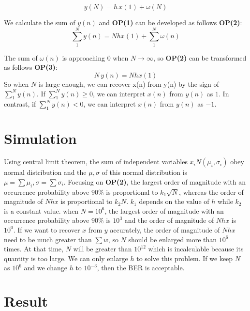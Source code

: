 \documentclass[conference]{IEEEtran}
\begin{document}
\begin{equation}
y(N) = h\,x(1)+\omega(N)
\end{equation}

We calculate the sum of $y(n)$ and \textbf{OP(1)} can be developed as follows \textbf{OP(2)}:
\begin{equation}
\sum^N_1 y(n) = Nhx(1)+\sum^N_1 \omega(n)
\end{equation}

The sum of $\omega(n)$ is approaching $0$ when $N\to \infty$, so \textbf{OP(2)} can be transformed as follows \textbf{OP(3)}:
\begin{equation}
N\,y(n)=Nhx(1)
\end{equation}
So when $N$ is large enough, we can recover x(n) from y(n) by the sign of $\sum^N_1y(n)$. If $\sum^N_1y(n) \ge 0$, we can interpret $x(n)$ from $y(n)$ as $1$. In contrast, if $\sum^N_1y(n) < 0$, we can interpret $x(n)$ from $y(n)$ as $-1$.


\section{Simulation}
Using central limit theorem, the sum of independent variables $x_i$\~{$N(\mu_i,\sigma_i)$} obey normal distribution and the $\mu, \sigma$ of this normal distribution is $\mu=\sum \mu _i, \sigma = \sum \sigma _i$. Focusing on \textbf{OP(2)}, the largest order of magnitude with an occurrence probability above $90\%$ is proportional to $k_1\sqrt{N}$, whereas the order of magnitude of $Nhx$ is proportional to $k_2N$. $k_1$ depends on the value of $h$ while $k_2$ is a constant value. when $N=10^6$, the largest order of magnitude with an occurrence probability above $90\%$ is $10^3$ and the order of magnitude of $Nhx$ is $10^0$. If we want to recover $x$ from $y$ accurately, the order of magnitude of $Nhx$ need to be much greater than $\sum w$, so $N$ should be enlarged more than $10^6$ times. At that time, $N$ will be greater than $10^{12}$ which is incalculable because its quantity is too large. We can only enlarge $h$ to solve this problem. If we keep $N$ as $10^6$ and we change $h$ to $10^{-3}$, then the BER is acceptable.







\section{Result}
\end{document}
